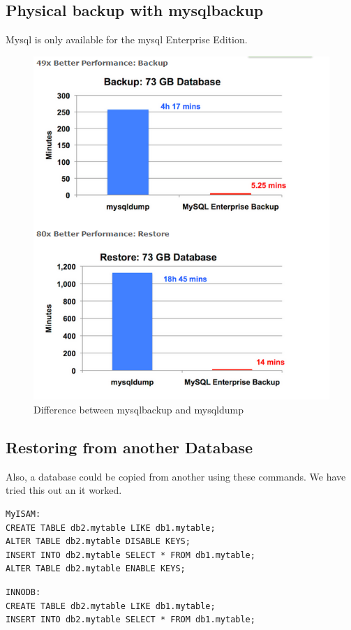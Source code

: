 \documentclass[10pt]{article}
\begin{document}
\subsection{Physical backup with mysqlbackup}
Mysql is only available for the mysql Enterprise Edition.
\begin{figure}[!h]
	\begin{center}
		\includegraphics[width=0.7\linewidth]{pictures/mysqlentbackup}
		\caption{Difference between mysqlbackup and mysqldump \cite{mysqlenterprisebackup}}
		\label{differenceent}
	\end{center}
\end{figure}\FloatBarrier
\subsection{Restoring from another Database}
Also, a database could be copied from another using these commands.
We have tried this out an it worked.
\begin{lstlisting}    
MyISAM:
CREATE TABLE db2.mytable LIKE db1.mytable;
ALTER TABLE db2.mytable DISABLE KEYS;
INSERT INTO db2.mytable SELECT * FROM db1.mytable;
ALTER TABLE db2.mytable ENABLE KEYS;
 \end{lstlisting}    
 \begin{lstlisting}    
INNODB:
CREATE TABLE db2.mytable LIKE db1.mytable;
INSERT INTO db2.mytable SELECT * FROM db1.mytable;
  \end{lstlisting}    
\cite{so1}
\end{document}
